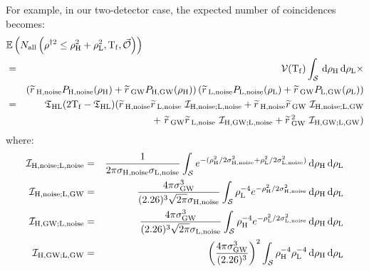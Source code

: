 For example, in our two-detector case, the expected number of coincidences becomes:
\begin{eqnarray}
\label{eqn:slideTerms}
\lefteqn{ \Exptd\left(N_{\mathrm{all}} \left(\rho^{\dagger2} \leq \rho_\varH^2 + \rho_\varL^2, \Tf, \vec{\mathcal{O}} \right) \right) } \nonumber \\
 & = &  \vT(\mathrm{T_f}) \int_\mathcal{S}  \d \rho_\varH \d \rho_\varL \times \nonumber \\
 & & \left(\rsrc_{\varH,\mathrm{noise}}P_{\varH,\mathrm{noise}}(\rho_\varH) + \rsrc_{\mathrm{GW}}P_{\varH,\mathrm{GW}}(\rho_\varH)\right) \left(\rsrc_{\varL,\mathrm{noise}}P_{\varL,\mathrm{noise}}(\rho_\varL) + \rsrc_{\mathrm{GW}}P_{\varL,\mathrm{GW}}(\rho_\varL)\right) \nonumber \\ 
 & = & \coincT_{\varH\varL}(2\Tf - \coincT_{\varH\varL}) ( \rsrc_{\varH,\mathrm{noise}}\rsrc_{\varL,\mathrm{noise}} ~ \mathcal{I}_{\mathrm{H,noise; L,noise}} + \rsrc_{\varH,\mathrm{noise}}\rsrc_{\mathrm{GW}} ~ \mathcal{I}_{\mathrm{H,noise; L,GW}}  \nonumber \\
 & & ~ + ~ \rsrc_{\mathrm{GW}}\rsrc_{\varL,\mathrm{noise}} ~ \mathcal{I}_{\mathrm{H,GW; L,noise}} + \rsrc_{\mathrm{GW}}^2 ~ \mathcal{I}_{\mathrm{H,GW; L,GW}} ) 
\end{eqnarray}
where:
\begin{eqnarray}
\label{eqn:HnoiseLnoiseIntegral}
\mathcal{I}_{\mathrm{H,noise; L,noise}} & = & \frac{1}{2\pi \sigma_{\varH,\mathrm{noise}} \sigma_{\varL,\mathrm{noise}}} \int_{\mathcal{S}} e^{-(\rho_{\varH}^2 / 2\sigma_{\varH,\mathrm{noise}}^2 + \rho_{\varL}^2 / 2\sigma_{\varL,\mathrm{noise}}^2 )} \d \rho_{\varH} \d \rho_{\varL} \\
\label{eqn:HnoiseLgwIntegral}
\mathcal{I}_{\mathrm{H,noise; L,GW}} & = & \frac{4\pi \sigma_{\mathrm{GW}}^3}{(2.26)^3 \sqrt{2\pi} \sigma_{\varH,\mathrm{noise}}} \int_{\mathcal{S}} \rho_\varL^{-4} e^{-\rho_{\varH}^2 / 2\sigma_{\varH,\mathrm{noise}}^2} \d \rho_\varH \d \rho_\varL \\
\label{eqn:HgwLnoiseIntegral}
\mathcal{I}_{\mathrm{H,GW; L,noise}} & = & \frac{4\pi \sigma_{\mathrm{GW}}^3}{(2.26)^3 \sqrt{2\pi} \sigma_{\varL,\mathrm{noise}}} \int_{\mathcal{S}} \rho_\varH^{-4} e^{-\rho_{\varL}^2 / 2\sigma_{\varL,\mathrm{noise}}^2} \d \rho_\varH \d \rho_\varL \\
\label{eqn:HgwLgwIntegral}
\mathcal{I}_{\mathrm{H,GW; L,GW}} & = & \left( \frac{4\pi \sigma_{\mathrm{GW}}^3}{(2.26)^3} \right)^2 \int_{\mathcal{S}} \rho_\varH^{-4} \rho_\varL^{-4} \d \rho_\varH \d \rho_\varL
\end{eqnarray}
